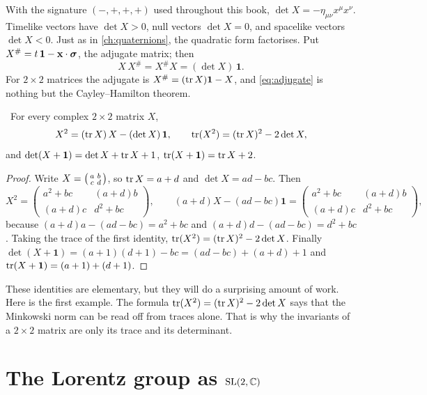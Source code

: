 With the signature $(-,+,+,+)$ used throughout this book, $\det X=-\eta_{\mu\nu}x^\mu x^\nu$. Timelike vectors have $\det X>0$, null vectors $\det X=0$, and spacelike vectors $\det X<0$. Just as in \cref{ch:quaternions}, the quadratic form factorises. Put $X^\#=t\,\mathbf 1-\mathbf x\cdot\boldsymbol{\sigma}$, the adjugate matrix; then
\begin{equation}\label{eq:adjugate}
X\,X^\#=X^\#X=(\det X)\,\mathbf 1 .
\end{equation}
For $2\times2$ matrices the adjugate is $X^\#=(\operatorname{tr} X)\mathbf 1-X$, and \eqref{eq:adjugate} is nothing but the Cayley--Hamilton theorem.

\begin{theorem}\label{thm:cayleyhamilton}\ver\
For every complex $2\times 2$ matrix $X$,
\[
X^2=(\operatorname{tr} X)\,X-(\det X)\,\mathbf 1,\qquad \operatorname{tr}(X^2)=(\operatorname{tr} X)^2-2\det X ,
\]
and $\det(X+\mathbf 1)=\det X+\operatorname{tr} X+1$, $\operatorname{tr}(X+\mathbf 1)=\operatorname{tr} X+2$.
\end{theorem}
\begin{proof}
Write $X=\begin{psmallmatrix}a&b\\c&d\end{psmallmatrix}$, so $\operatorname{tr} X=a+d$ and $\det X=ad-bc$. Then
\[
X^2=\begin{pmatrix}a^2+bc&(a+d)b\\(a+d)c&d^2+bc\end{pmatrix},\qquad
(a+d)X-(ad-bc)\mathbf 1=\begin{pmatrix}a^2+bc&(a+d)b\\(a+d)c&d^2+bc\end{pmatrix},
\]
because $(a+d)a-(ad-bc)=a^2+bc$ and $(a+d)d-(ad-bc)=d^2+bc$. Taking the trace of the first identity, $\operatorname{tr}(X^2)=(\operatorname{tr} X)^2-2\det X$. Finally $\det(X+\mathbf 1)=(a+1)(d+1)-bc=(ad-bc)+(a+d)+1$ and $\operatorname{tr}(X+\mathbf 1)=(a+1)+(d+1)$.
\end{proof}


These identities are elementary, but they will do a surprising amount of work. Here is the first example. The formula $\operatorname{tr}(X^2)=(\operatorname{tr} X)^2-2\det X$ says that the Minkowski norm can be read off from traces alone. That is why the invariants of a $2\times2$ matrix are only its trace and its determinant.

\section{The Lorentz group as \texorpdfstring{$\mathrm{SL}(2,\mathbb{C})$}{SL(2,C)}}

